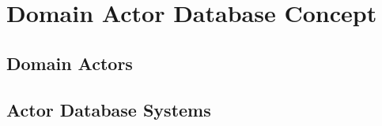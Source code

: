 
\section{Domain Actor Database Concept}\label{sec:concept}

  \subsection{Domain Actors}\label{sec:dactors}

  \subsection{Actor Database Systems}\label{sec:actor_database_systems}
